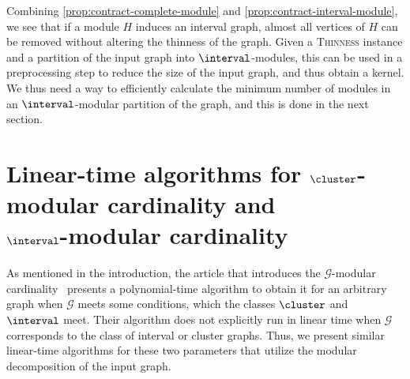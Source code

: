 \documentclass[11pt]{article}
\theoremstyle{plain}
\theoremstyle{definition}
\theoremstyle{remark}
\newcommand{\G}{\mathcal{G}}
\begin{document}
Combining \cref{prop:contract-complete-module} and \cref{prop:contract-interval-module}, we see that if a module $H$ induces an interval graph, almost all vertices of $H$ can be removed without altering the thinness of the graph. Given a \textsc{Thinness} instance and a partition of the input graph into $\interval$-modules, this can be used in a preprocessing step to reduce the size of the input graph, and thus obtain a kernel. We thus need a way to efficiently calculate the minimum number of modules in an $\interval$-modular partition of the graph, and this is done in the next section.


\section{Linear-time algorithms for \texorpdfstring{$\cluster$}{clusters}-modular cardinality and\\ \texorpdfstring{$\interval$}{intervals}-modular cardinality}
\label{sec:modular-cardinality}

As mentioned in the introduction, the article that introduces the $\G$-modular cardinality~\citep{modular-partitions-MFCS23} presents a polynomial-time algorithm to obtain it for an arbitrary graph when $\G$ meets some conditions, which the classes $\cluster$ and $\interval$ meet. Their algorithm does not explicitly run in linear time when $\G$ corresponds to the class of interval or cluster graphs. Thus, we present similar linear-time algorithms for these two parameters that utilize the modular decomposition of the input graph.
\end{document}
